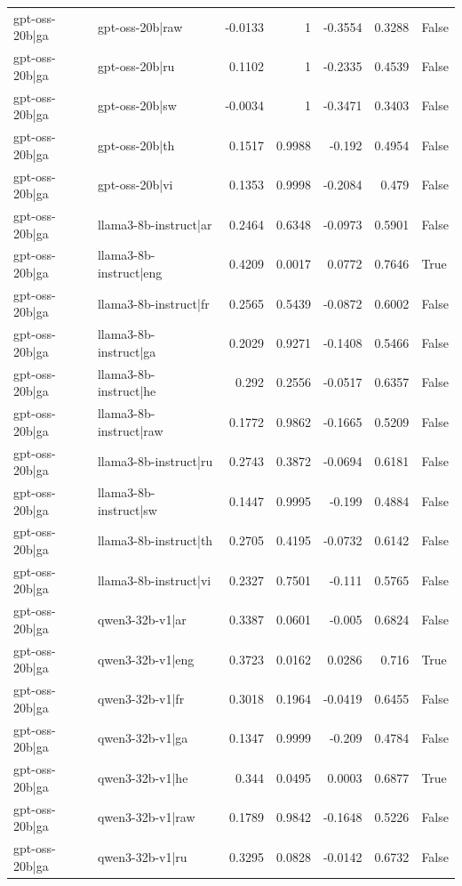 \begin{table}
\begin{tabular}{l l r r r r l}
gpt-oss-20b|ga & gpt-oss-20b|raw & -0.0133 & 1 & -0.3554 & 0.3288 & False \\
gpt-oss-20b|ga & gpt-oss-20b|ru & 0.1102 & 1 & -0.2335 & 0.4539 & False \\
gpt-oss-20b|ga & gpt-oss-20b|sw & -0.0034 & 1 & -0.3471 & 0.3403 & False \\
gpt-oss-20b|ga & gpt-oss-20b|th & 0.1517 & 0.9988 & -0.192 & 0.4954 & False \\
gpt-oss-20b|ga & gpt-oss-20b|vi & 0.1353 & 0.9998 & -0.2084 & 0.479 & False \\
gpt-oss-20b|ga & llama3-8b-instruct|ar & 0.2464 & 0.6348 & -0.0973 & 0.5901 & False \\
gpt-oss-20b|ga & llama3-8b-instruct|eng & 0.4209 & 0.0017 & 0.0772 & 0.7646 & True \\
gpt-oss-20b|ga & llama3-8b-instruct|fr & 0.2565 & 0.5439 & -0.0872 & 0.6002 & False \\
gpt-oss-20b|ga & llama3-8b-instruct|ga & 0.2029 & 0.9271 & -0.1408 & 0.5466 & False \\
gpt-oss-20b|ga & llama3-8b-instruct|he & 0.292 & 0.2556 & -0.0517 & 0.6357 & False \\
gpt-oss-20b|ga & llama3-8b-instruct|raw & 0.1772 & 0.9862 & -0.1665 & 0.5209 & False \\
gpt-oss-20b|ga & llama3-8b-instruct|ru & 0.2743 & 0.3872 & -0.0694 & 0.6181 & False \\
gpt-oss-20b|ga & llama3-8b-instruct|sw & 0.1447 & 0.9995 & -0.199 & 0.4884 & False \\
gpt-oss-20b|ga & llama3-8b-instruct|th & 0.2705 & 0.4195 & -0.0732 & 0.6142 & False \\
gpt-oss-20b|ga & llama3-8b-instruct|vi & 0.2327 & 0.7501 & -0.111 & 0.5765 & False \\
gpt-oss-20b|ga & qwen3-32b-v1|ar & 0.3387 & 0.0601 & -0.005 & 0.6824 & False \\
gpt-oss-20b|ga & qwen3-32b-v1|eng & 0.3723 & 0.0162 & 0.0286 & 0.716 & True \\
gpt-oss-20b|ga & qwen3-32b-v1|fr & 0.3018 & 0.1964 & -0.0419 & 0.6455 & False \\
gpt-oss-20b|ga & qwen3-32b-v1|ga & 0.1347 & 0.9999 & -0.209 & 0.4784 & False \\
gpt-oss-20b|ga & qwen3-32b-v1|he & 0.344 & 0.0495 & 0.0003 & 0.6877 & True \\
gpt-oss-20b|ga & qwen3-32b-v1|raw & 0.1789 & 0.9842 & -0.1648 & 0.5226 & False \\
gpt-oss-20b|ga & qwen3-32b-v1|ru & 0.3295 & 0.0828 & -0.0142 & 0.6732 & False \\

\end{tabular}
\end{table}

